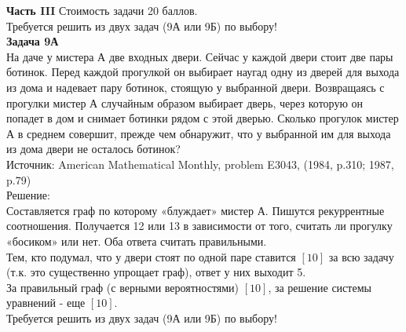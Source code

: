 \documentclass[12pt, a4paper]{article}\usepackage[]{graphicx}\usepackage[]{color}
\begin{document}
	\textbf{Часть III} Стоимость задачи 20 баллов. \\

	Требуется решить \textbf{} из двух задач (9А или 9Б) по
	выбору! \\

	\textbf{Задача 9А} \\
	На даче у мистера А две входных двери. Сейчас у каждой двери стоит две пары ботинок. Перед каждой прогулкой он выбирает наугад одну из дверей для выхода из дома и надевает пару ботинок, стоящую у выбранной двери. Возвращаясь с прогулки мистер А случайным образом выбирает дверь, через которую он попадет в дом и снимает ботинки рядом с этой дверью. Сколько прогулок мистер А в среднем совершит, прежде чем обнаружит, что у выбранной им для выхода из дома двери не осталось ботинок? \\
	Источник: American Mathematical Monthly, problem E3043, (1984, p.310; 1987, p.79)\\
	Решение: \\
	Составляется граф по которому «блуждает» мистер А. Пишутся рекуррентные соотношения.
	Получается 12 или 13 в зависимости от того, считать ли прогулку «босиком» или нет.
	Оба ответа считать правильными.\\
	Тем, кто подумал, что у двери стоят по одной паре ставится $[10]$ за всю задачу (т.к. это существенно упрощает граф), ответ у них выходит 5. \\
	За правильный граф (с верными вероятностями) $[10]$, за решение системы уравнений - еще $[10]$. \\




	Требуется решить \textbf{} из двух задач (9А или 9Б) по
	выбору! \\
\end{document}
